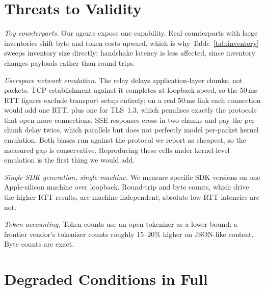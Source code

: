 \documentclass{article}
\newcommand{\tabfont}{\footnotesize\setlength{\tabcolsep}{4pt}}
\begin{document}



\appendix

\section{Threats to Validity}
\label{app:validity}

\emph{Toy counterparts.} Our agents expose one capability. Real
counterparts with large inventories shift byte and token costs upward,
which is why Table~\ref{tab:inventory} sweeps inventory size directly;
handshake latency is less affected, since inventory changes payloads rather
than round trips.

\emph{Userspace network emulation.} The relay delays application-layer
chunks, not packets. TCP establishment against it completes at loopback
speed, so the 50\,ms-RTT figures exclude transport setup entirely; on a
real 50\,ms link each connection would add one RTT, plus one for TLS~1.3,
which penalises exactly the protocols that open more connections. SSE
responses cross in two chunks and pay the per-chunk delay twice, which
parallels but does not perfectly model per-packet kernel emulation. Both
biases run against the protocol we report as cheapest, so the measured gap
is conservative. Reproducing these cells under kernel-level emulation is
the first thing we would add.

\emph{Single SDK generation, single machine.} We measure specific SDK
versions on one Apple-silicon machine over loopback. Round-trip and byte
counts, which drive the higher-RTT results, are machine-independent;
absolute low-RTT latencies are not.

\emph{Token accounting.} Token counts use an open tokenizer as a lower
bound; a frontier vendor's tokenizer counts roughly 15--20\% higher on
JSON-like content. Byte counts are exact.

\section{Degraded Conditions in Full}
\label{app:degraded}

\begin{table}[h]
\centering
\tabfont
\caption{Behaviour under degraded conditions ($N{=}\NRuns{}$ per cell,
localhost). S4a reports time to task-ready with a 2\,s per-response server
delay; S4b and S4c report time to failure. For S4c, ACP is untestable: its
manifest carries no protocol-version field.}
\label{tab:degraded}

\end{table}
\end{document}
